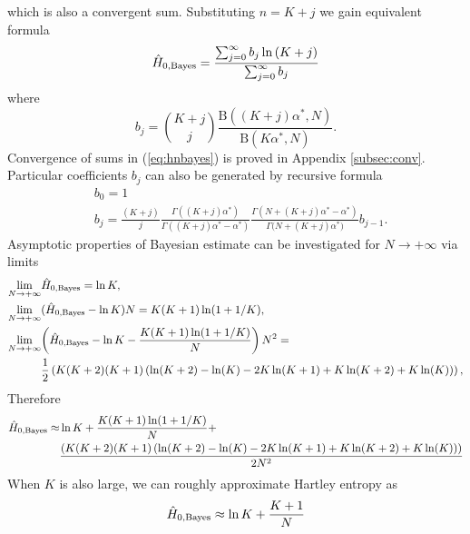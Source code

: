 which is also a convergent sum. Substituting $n=K+j$ we gain equivalent formula
\begin{equation} 
\label{eq:hnbayesb}
\hat{H}_{0,\mbox{\scriptsize{Bayes}}} = \frac{\sum_{j=0}^{\infty}{b_{j}\ln{(K+j)}}}{\sum_{j=0}^{\infty}{b_j}}
\end{equation}
where
\begin{equation}
b_{j}= {K+j \choose j} \frac{\mathrm{B}\left( (K+j)\alpha^{*}, N \right)}{\mathrm{B}\left( K\alpha^{*}, N \right)}.
\end{equation} 
Convergence of sums in (\ref{eq:hnbayes}) is proved in Appendix \ref{subsec:conv}. Particular coefficients $b_{j}$ can also be generated by recursive formula
\begin{equation}
\label{eq:breform}
\begin{split}
& b_{0} = 1 \\
& b_{j} = \frac{(K+j)}{j} \frac{\Gamma{((K+j)\alpha^{*})}}{\Gamma{((K+j)\alpha^{*}-\alpha^{*})}}\frac{\Gamma{(N+(K+j)\alpha^{*} -\alpha^{*})}}{\Gamma({N+(K+j)\alpha^{*})}} b_{j-1}.
\end{split}
\end{equation}
Asymptotic properties of Bayesian estimate can be investigated for $N \rightarrow +\infty$ via limits
\begin{equation} 
\label{eq:lim}
\begin{split}
\lim_{N \rightarrow +\infty} & {\hat{H}_{0,\mbox{\scriptsize{Bayes}}}} = \ln{K}, \\
\lim_{N \rightarrow +\infty} & {(\hat{H}_{0,\mbox{\scriptsize{Bayes}}}-\ln{K})N} = K(K+1)\ln(1+1/K), \\
\lim_{N \rightarrow +\infty} & {\left(\hat{H}_{0,\mbox{\scriptsize{Bayes}}}-\ln{K}-\frac{K(K+1)\ln(1+1/K)}{N}\right)N^2} = \\
& \frac{1}{2}\left(K(K+2)(K+1)\left(\ln(K+2)-\ln(K)-2K\ln(K+1)+K\ln(K+2)+K\ln(K)\right)\right),
\end{split}
\end{equation}
Therefore
\begin{equation} 
\label{eq:hroz}
\begin{split}
\hat{H}_{0,\mbox{\scriptsize{Bayes}}} \approx & \ln{K} + \frac{K(K+1)\ln(1+1/K)}{N} + \\ 
& \frac{\left(K(K+2)(K+1)\left(\ln(K+2)-\ln(K)-2K\ln(K+1)+K\ln(K+2)+K\ln(K)\right)\right)}{2N^2}
\end{split}
\end{equation}
When $K$ is also large, we can roughly approximate Hartley entropy as
\begin{equation} 
\label{eq:hartapp}
\hat{H}_{0,\mbox{\scriptsize{Bayes}}} \approx \ln{K} + \frac{K+1}{N}
\end{equation}
